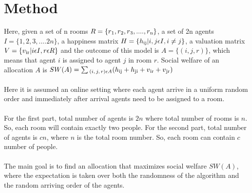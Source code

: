 \documentclass[12pt]{article}
\begin{document}
\section*{Method}
Here, given a set of n rooms $R = \{r\textsubscript1, r\textsubscript2, r\textsubscript3,....,r\textsubscript n\}$, a set of 2n agents $I = \{1,2,3,....2n\}$, a happiness matrix $H = \{h\textsubscript{ij} | i, j \epsilon I, i \ne j\}$, a valuation matrix $V = \{v\textsubscript{ir} | i \epsilon I , r \epsilon R\}$ and the outcome of this model is $A = \{(i,j,r)\}$, which means that agent $i$ is assigned to agent $j$ in room $r$.
Social welfare of an allocation $A$ is $SW(A) = \sum \textsubscript{$(i,j,r) \epsilon A$} (h\textsubscript{ij} + h\textsubscript{ji} + v\textsubscript{ir} + v\textsubscript{jr})$\\\\
Here it is assumed an online setting where each agent arrive in a uniform random order and immediately after arrival agents need to be assigned to a room.\\\\
For the first part, total number of agents is $2n$ where total number of rooms is $n$. So, each room will contain exactly two people. For the second part, total number of agents is $cn$, where $n$ is the total room number. So, each room can contain $c$ number of people.\\\\
The main goal is to find an allocation that maximizes social welfare $SW(A)$, where the expectation is taken over both the randomness of the algorithm and the random arriving order of the agents.
\newpage
\end{document}
